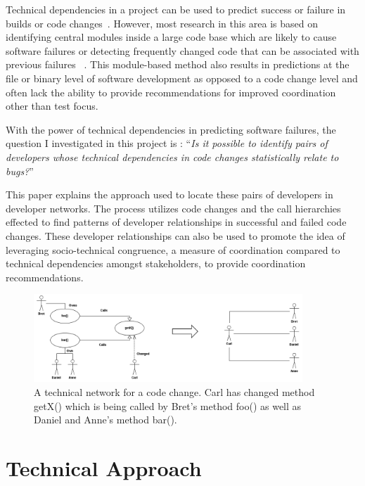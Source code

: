 \documentclass[conference]{IEEEtran}
\begin{document}
Technical dependencies in a project can be used to predict success or failure in
 builds or code changes~\cite{Pinzger:2008:DNP, Zimmermann:2008:PDU}. However, most 
research in this area is based on identifying
central modules inside a large code base which are likely to cause software failures or
detecting frequently changed code that can be associated with previous failures
~\cite{Kim:2006:AIB}. 
This module-based method also results in predictions 
at the file or binary level of software development as opposed to a code change level
and often lack the ability to provide recommendations for improved coordination
other than test focus.

With the power of technical dependencies in predicting software failures, the question I
investigated in this project is : 
``\textit{Is it possible to identify pairs of developers whose technical dependencies in code changes
statistically relate to bugs?}''

This paper explains the approach used to locate these pairs of developers in developer networks.
The process utilizes code changes and the call hierarchies effected  to find patterns of developer 
relationships in successful and failed code changes.  These developer relationships can also be used
to promote the idea of leveraging socio-technical congruence, a measure of coordination compared
to technical dependencies amongst stakeholders, to provide coordination recommendations.

\begin{figure}[tb!]
\centering
\includegraphics[width=0.9\textwidth]{images/TecNetwork}
\caption{A technical network for a code change. Carl has changed method getX() which is being
called by Bret's method foo() as well as Daniel and Anne's method bar().\label{fig:network}}
\end{figure}

\section{Technical Approach}
\end{document}
